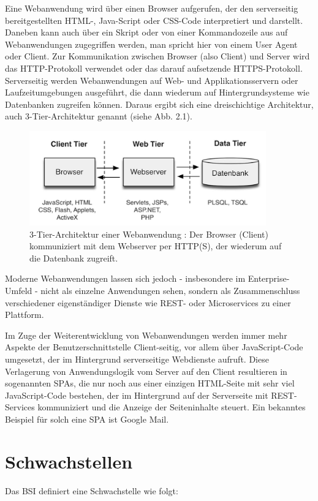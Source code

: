 \documentclass[12pt,oneside,a4paper,parskip,pointlessnumbers]{scrbook}
\begin{document}
  Eine Webanwendung wird über einen Browser aufgerufen, der den serverseitig bereitgestellten HTML-, Java-Script oder CSS-Code interpretiert und darstellt. Daneben kann auch über ein Skript oder von einer Kommandozeile aus auf Webanwendungen zugegriffen werden, man spricht hier von einem User Agent oder Client.
  Zur Kommunikation zwischen Browser (also Client) und Server wird das HTTP-Protokoll verwendet oder das darauf aufsetzende HTTPS-Protokoll.
  Serverseitig werden Webanwendungen auf Web- und Applikationsservern oder Laufzeitumgebungen ausgeführt, die dann wiederum auf Hintergrundsysteme wie Datenbanken zugreifen können. Daraus ergibt sich eine dreischichtige Architektur, auch 3-Tier-Architektur genannt (siehe Abb. 2.1).
    \begin{figure}[H]
    \centering
     \includegraphics[width=0.91\textwidth]{Images/3_Tier_Architektur}
    \caption[3-Tier-Architektur einer Webanwendung]{3-Tier-Architektur einer Webanwendung \cite[S.2]{Rohr}: Der Browser (Client) kommuniziert mit dem Webserver per HTTP(S), der wiederum auf die Datenbank zugreift.}
  \end{figure}
  Moderne Webanwendungen lassen sich jedoch - insbesondere im Enterprise-Umfeld - nicht als einzelne Anwendungen sehen, sondern als Zusammenschluss verschiedener eigenständiger Dienste wie REST- oder Microservices zu einer Plattform.

  Im Zuge der Weiterentwicklung von Webanwendungen werden immer mehr Aspekte der Benutzerschnittstelle Client-seitig, vor allem über JavaScript-Code umgesetzt, der im Hintergrund serverseitige Webdienste aufruft.
  Diese Verlagerung von Anwendungslogik vom Server auf den Client resultieren in sogenannten \acp{SPA}, die nur noch aus einer einzigen HTML-Seite mit sehr viel JavaScript-Code bestehen, der im Hintergrund auf der Serverseite mit REST-Services kommuniziert und die Anzeige der Seiteninhalte steuert. Ein bekanntes Beispiel für solch eine \ac{SPA} ist Google Mail.
  \cite{Rohr}

 \section{Schwachstellen}
  Das \ac{BSI} definiert eine Schwachstelle wie folgt:
\end{document}
